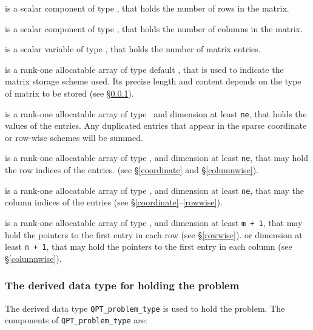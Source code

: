 \documentclass{galahad}
\begin{document}
\begin{description}

 is a scalar component of type \integer,
that holds the number of rows in the matrix.

 is a scalar component of type \integer,
that holds the number of columns in the matrix.

 is a scalar variable of type \integer, that
holds the number of matrix entries.

 is a rank-one allocatable array of type default \character, that
is used to indicate the matrix storage scheme used. Its precise length and
content depends on the type of matrix to be stored (see \S\ref{typeprob}).

 is a rank-one allocatable array of type \realdp\,
and dimension at least {\tt ne}, that holds the values of the entries.
Any duplicated entries that appear in the sparse
coordinate or row-wise schemes will be summed.

 is a rank-one allocatable array of type \integer,
and dimension at least {\tt ne}, that may hold the row indices of the entries.
(see \S\ref{coordinate} and \S\ref{columnwise}).

 is a rank-one allocatable array of type \integer,
and dimension at least {\tt ne}, that may the column indices of the entries
(see \S\ref{coordinate}--\ref{rowwise}).

 is a rank-one allocatable array of type \integer,
and dimension at least {\tt m + 1}, that may hold the pointers to
the first entry in each row (see \S\ref{rowwise}).
or dimension at least {\tt n + 1}, that may hold the pointers to
the first entry in each column (see \S\ref{columnwise}).

\end{description}


\subsubsection{The derived data type for holding the problem}\label{typeprob}
The derived data type {\tt QPT\_problem\_type} is used to hold
the problem. The components of
{\tt QPT\_problem\_type}
are:
\end{document}
